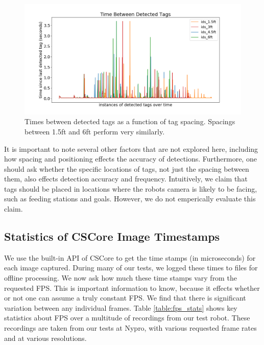 \documentclass{article}
\begin{document}
    \begin{figure}[H]
      \centering
      \includegraphics[width=1\linewidth]{./images/spacing_times.png}
      \caption{Times between detected tags as a function of tag spacing. Spacings between 1.5ft and 6ft perform very similarly.}
      \label{fig:spacing_timing}
    \end{figure}


    It is important to note several other factors that are not explored here, including how spacing and positioning effects the accuracy of detections. Furthermore, one should ask whether the specific locations of tags, not just the spacing between them, also effects detection accuracy and frequency. Intuitively, we claim that tags should be placed in locations where the robots camera is likely to be facing, such as feeding stations and goals. However, we do not emperically evaluate this claim.

	\subsection{Statistics of CSCore Image Timestamps}

    We use the built-in API of CSCore to get the time stamps (in microseconds) for each image captured. During many of our tests, we logged these times to files for offline processing. We now ask how much these time stamps vary from the requested FPS. This is important information to know, because it effects whether or not one can assume a truly constant FPS. We find that there is significant variation between any individual frames. Table \ref{table:fps_stats} shows key statistics about FPS over a multitude of recordings from our test robot. These recordings are taken from our tests at Nypro, with various requested frame rates and at various resolutions.
\end{document}
